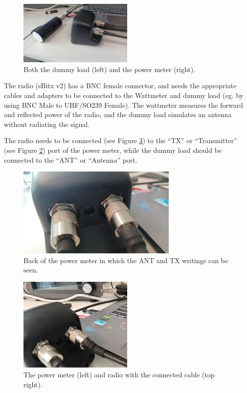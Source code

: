 \documentclass[11pt,a4paper]{article}
\begin{document}
\begin{figure}[H]
  \centering
  \includegraphics[width=0.5\textwidth]{pictures/wattmeter_3.jpeg}
  \caption{Both the dummy load (left) and the power meter (right).}
  \label{fig:backview3}
\end{figure}


The radio (sBitx v2) has a BNC female connector, and needs the appropriate cables and adapters to
be connected to the Wattmeter and dummy load (eg. by using BNC Male to UHF/SO239 Female). The wattmeter measures the forward and reflected power of the radio,
and the dummy load simulates an antenna without radiating the signal.

The radio needs to be connected (see Figure \ref{fig:backview4}) to the ``TX'' or ``Transmitter'' (see Figure \ref{fig:backview2}) port of the power meter, while the dummy load
should be connected to the ``ANT'' or ``Antenna'' port.

\begin{figure}[!ht]
  \centering
  \includegraphics[width=0.7\textwidth]{pictures/wattmeter_2.jpeg}
  \caption{Back of the power meter in which the ANT and TX writings can be seen.}
  \label{fig:backview2}
\end{figure}

\begin{figure}[!ht]
  \centering
  \includegraphics[width=0.5\textwidth]{pictures/wattmeter_4-edited.jpeg}
  \caption{The power meter (left) and radio with the connected cable (top right).}
  \label{fig:backview4}
\end{figure}
\end{document}
